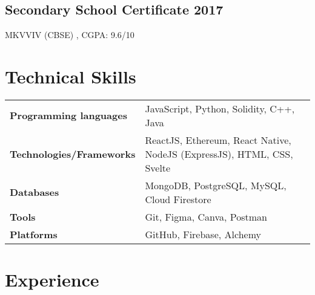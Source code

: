 \documentclass[a4,10pt]{article}
\newcommand{\hskills}[1]{
\textbf{\bfseries #1} }
\begin{document}
\subsection*{Secondary School Certificate \hfill 2017} {\normalsize \normalfont MKVVIV (CBSE) , CGPA: 9.6/10} 
\vspace{-0.5cm}


\section{Technical Skills}
\vspace{-0.2cm}
\begin{tabular}{p{12em} p{32em}}
\hskills{Programming languages} & JavaScript, Python, Solidity, C++, Java \\
\hskills{Technologies/Frameworks} & ReactJS, Ethereum, React Native, NodeJS (ExpressJS), HTML, CSS, Svelte \\
\hskills{Databases} & MongoDB, PostgreSQL, MySQL, Cloud Firestore \\
\hskills{Tools} & Git, Figma, Canva, Postman  \\
\hskills{Platforms} & GitHub, Firebase, Alchemy  \\
\end{tabular}
\vspace{-0.5cm}


\section{Experience}
\vspace{-0.1cm}
\end{document}
